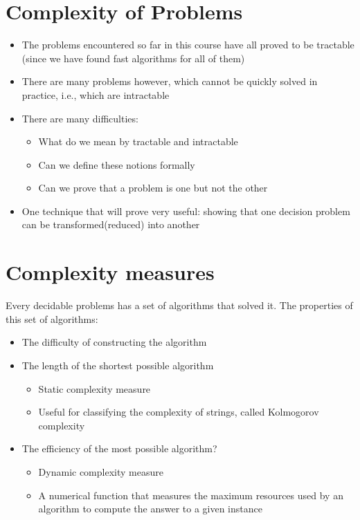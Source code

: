 \documentclass{article}[18pt]
\begin{document}
\section{Complexity of Problems}
\begin{itemize}
	\item The problems encountered so far in this course have all proved to be tractable (since we have found fast algorithms for all of them)
	\item There are many problems however, which cannot be quickly solved in practice, i.e., which are intractable
	\item There are many difficulties:
	\begin{itemize}
		\item What do we mean by tractable and intractable
		\item Can we define these notions formally
		\item Can we prove that a problem is one but not the other
	\end{itemize}
	\item One technique that will prove very useful: showing that one decision problem can be transformed(reduced) into another
\end{itemize}
\section{Complexity measures}
Every decidable problems has a set of algorithms that solved it. The properties of this set of algorithms:
\begin{itemize}
	\item The difficulty of constructing the algorithm
	\item The length of the shortest possible algorithm
	\begin{itemize}
		\item Static complexity measure
		\item Useful for classifying the complexity of strings, called Kolmogorov complexity
	\end{itemize}
	\item The efficiency of the most possible algorithm?
	\begin{itemize}
		\item Dynamic complexity measure
		\item A numerical function that measures the maximum resources used by an algorithm to compute the answer to a given instance
	\end{itemize}
\end{itemize}
\end{document}
